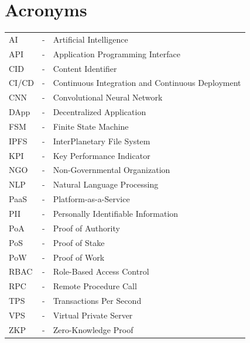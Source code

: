 \chapter*{Acronyms}

\noindent \begin{tabular}{lcl}
AI      & - & Artificial Intelligence\\
API     & - & Application Programming Interface\\
CID     & - & Content Identifier\\
CI/CD   & - & Continuous Integration and Continuous Deployment\\
CNN     & - & Convolutional Neural Network\\
DApp    & - & Decentralized Application\\
FSM     & - & Finite State Machine\\
IPFS    & - & InterPlanetary File System\\
KPI     & - & Key Performance Indicator\\
NGO     & - & Non-Governmental Organization\\
NLP     & - & Natural Language Processing\\
PaaS    & - & Platform-as-a-Service\\
PII     & - & Personally Identifiable Information\\
PoA     & - & Proof of Authority\\
PoS     & - & Proof of Stake\\
PoW     & - & Proof of Work\\
RBAC    & - & Role-Based Access Control\\
RPC     & - & Remote Procedure Call\\
TPS     & - & Transactions Per Second\\
VPS     & - & Virtual Private Server\\
ZKP     & - & Zero-Knowledge Proof\\
\end{tabular}


